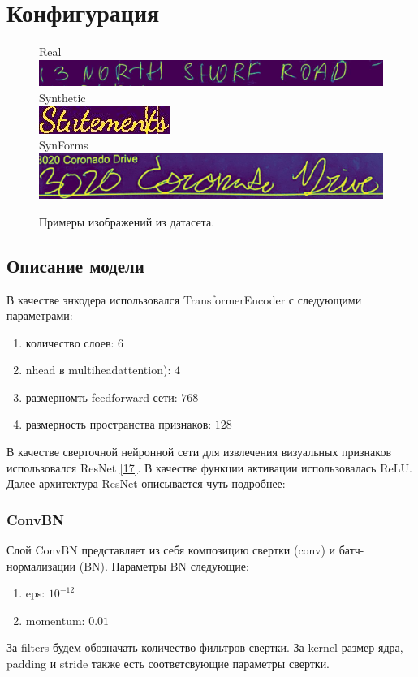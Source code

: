 \section{Конфигурация}
\label{sec:Chapter3} 

\begin{figure}
    \centering
    Real \\
    \includegraphics[scale=0.45]{./images/data/Real.jpg} \\
    Synthetic
    \\
    \includegraphics[scale=3]{./images/data/Synthetic.jpg} \\
    SynForms
    \\
    \includegraphics[scale=0.4]{./images/data/SynForms.jpg}
    \caption{\protect\hypertarget{image11}{Примеры изображений из датасета.}}
\end{figure}

\subsection{Описание модели}
В качестве энкодера использовался TransformerEncoder с следующими параметрами:
\begin{enumerate}
\item количество слоев: $6$
\item nhead в multiheadattention): $4$
\item размерномть feedforward сети: $768$
\item размерность пространства признаков: $128$
\end{enumerate}

В качестве сверточной нейронной сети для извлечения визуальных признаков использовался ResNet \hyperlink{cite.Kai15}{[17]}. В качестве функции активации использовалась ReLU. Далее архитектура ResNet описывается чуть подробнее:

\subsubsection{ConvBN}
Слой ConvBN представляет из себя композицию свертки (conv) и батч-нормализации (BN). Параметры BN следующие:
\begin{enumerate}
\item eps: $10^{-12}$
\item momentum: $0.01$
\end{enumerate}
За filters будем обозначать количество фильтров свертки. За kernel размер ядра, padding и stride также есть соответсвующие параметры свертки.

